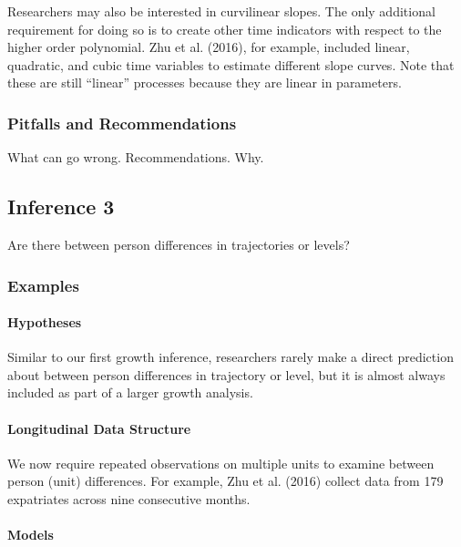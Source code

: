 \documentclass[english,,man]{apa6}
\let\oldparagraph\paragraph
\renewcommand{\paragraph}[1]{\oldparagraph{#1}\mbox{}}
\theoremstyle{definition}
\theoremstyle{definition}
\theoremstyle{definition}
\theoremstyle{remark}
\begin{document}
Researchers may also be interested in curvilinear slopes. The only
additional requirement for doing so is to create other time indicators
with respect to the higher order polynomial. Zhu et al. (2016), for
example, included linear, quadratic, and cubic time variables to
estimate different slope curves. Note that these are still
\enquote{linear} processes because they are linear in parameters.

\hypertarget{pitfalls-and-recommendations-2}{%
\subsubsection{Pitfalls and
Recommendations}\label{pitfalls-and-recommendations-2}}

What can go wrong. Recommendations. Why.

\hypertarget{inference-3}{%
\subsection{Inference 3}\label{inference-3}}

Are there between person differences in trajectories or levels?

\hypertarget{examples-3}{%
\subsubsection{Examples}\label{examples-3}}

\hypertarget{hypotheses-3}{%
\paragraph{Hypotheses}\label{hypotheses-3}}

Similar to our first growth inference, researchers rarely make a direct
prediction about between person differences in trajectory or level, but
it is almost always included as part of a larger growth analysis.

\hypertarget{longitudinal-data-structure-3}{%
\paragraph{Longitudinal Data
Structure}\label{longitudinal-data-structure-3}}

We now require repeated observations on multiple units to examine
between person (unit) differences. For example, Zhu et al. (2016)
collect data from 179 expatriates across nine consecutive months.

\hypertarget{models-3}{%
\paragraph{Models}\label{models-3}}
\end{document}
